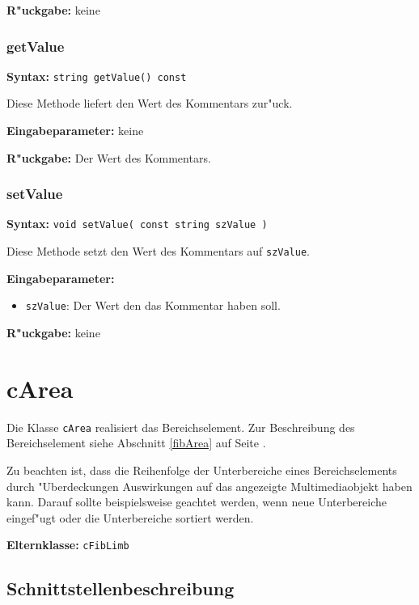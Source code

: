 \bigskip\noindent
\textbf{R"uckgabe:} keine


\subsubsection{getValue}

\textbf{Syntax:} \verb|string getValue() const|

\bigskip\noindent
Diese Methode liefert den Wert des Kommentars zur"uck.

\bigskip\noindent
\textbf{Eingabeparameter:} keine

\bigskip\noindent
\textbf{R"uckgabe:} Der Wert des Kommentars.


\subsubsection{setValue}

\textbf{Syntax:} \verb|void setValue( const string szValue )|

\bigskip\noindent
Diese Methode setzt den Wert des Kommentars auf \verb|szValue|.

\bigskip\noindent
\textbf{Eingabeparameter:}
\begin{itemize}
 \item \verb|szValue|: Der Wert den das Kommentar haben soll.
\end{itemize}

\bigskip\noindent
\textbf{R"uckgabe:} keine


\section{cArea}

Die Klasse \verb|cArea| realisiert das Bereichselement.
Zur Beschreibung des Bereichselement siehe Abschnitt \ref{fibArea} auf Seite \pageref{fibArea} .

Zu beachten ist, dass die Reihenfolge der Unterbereiche eines Bereichselements durch "Uberdeckungen Auswirkungen auf das angezeigte Multimediaobjekt haben kann. Darauf sollte beispielsweise geachtet werden, wenn neue Unterbereiche eingef"ugt oder die Unterbereiche sortiert werden.

\bigskip\noindent
\textbf{Elternklasse:} \verb|cFibLimb|


\subsection{Schnittstellenbeschreibung}

